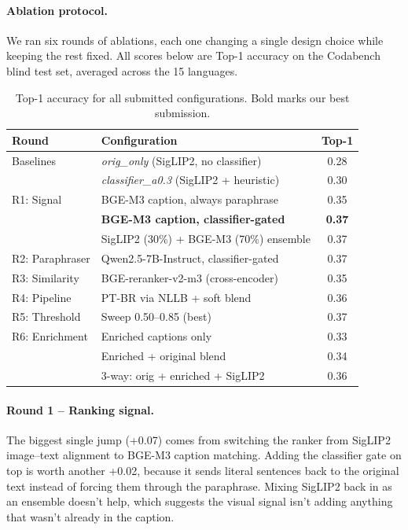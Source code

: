 \documentclass[11pt]{article}
\begin{document}
\paragraph{Ablation protocol.}
We ran six rounds of ablations, each one changing a single design choice while
keeping the rest fixed. All scores below are Top-1 accuracy on the Codabench
blind test set, averaged across the 15 languages.

\begin{table}[t]
\centering
\small
\begin{tabular}{llc}
\toprule
\textbf{Round} & \textbf{Configuration} & \textbf{Top-1} \\
\midrule
Baselines
  & \textit{orig\_only} (SigLIP2, no classifier)         & 0.28 \\
  & \textit{classifier\_a0.3} (SigLIP2 + heuristic)      & 0.30 \\
\midrule
R1: Signal
  & BGE-M3 caption, always paraphrase                    & 0.35 \\
  & \textbf{BGE-M3 caption, classifier-gated}            & \textbf{0.37} \\
  & SigLIP2 (30\%) + BGE-M3 (70\%) ensemble              & 0.37 \\
\midrule
R2: Paraphraser
  & Qwen2.5-7B-Instruct, classifier-gated                & 0.37 \\
\midrule
R3: Similarity
  & BGE-reranker-v2-m3 (cross-encoder)                   & 0.35 \\
\midrule
R4: Pipeline
  & PT-BR via NLLB + soft blend                          & 0.36 \\
\midrule
R5: Threshold
  & Sweep 0.50--0.85 (best)                              & 0.37 \\
\midrule
R6: Enrichment
  & Enriched captions only                               & 0.33 \\
  & Enriched + original blend                            & 0.34 \\
  & 3-way: orig + enriched + SigLIP2                     & 0.36 \\
\bottomrule
\end{tabular}
\caption{Top-1 accuracy for all submitted configurations.
         Bold marks our best submission.}
\label{tab:results}
\end{table}

\paragraph{Round 1 -- Ranking signal.}
The biggest single jump (+0.07) comes from switching the ranker from SigLIP2
image--text alignment to BGE-M3 caption matching. Adding the classifier gate
on top is worth another +0.02, because it sends literal sentences back to the
original text instead of forcing them through the paraphrase. Mixing SigLIP2
back in as an ensemble doesn't help, which suggests the visual signal isn't
adding anything that wasn't already in the caption.
\end{document}
